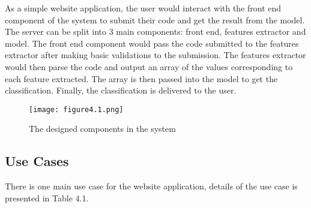 \documentclass{report}
\begin{document}
As a simple website application, the user would interact with the front end component of the system to submit their code and get the result from the model. The server can be split into 3 main components: front end, features extractor and model. The front end component would pass the code submitted to the features extractor after making basic validations to the submission. The features extractor would then parse the code and output an array of the values corresponding to each feature extracted. The array is then passed into the model to get the classification. Finally, the classification is delivered to the user.

\begin{figure}[h!]
\centering
\texttt{[image: figure4.1.png]}
\caption{The designed components in the system}
\end{figure}

\subsection{Use Cases}

There is one main use case for the website application, details of the use case is presented in Table 4.1.
\end{document}
